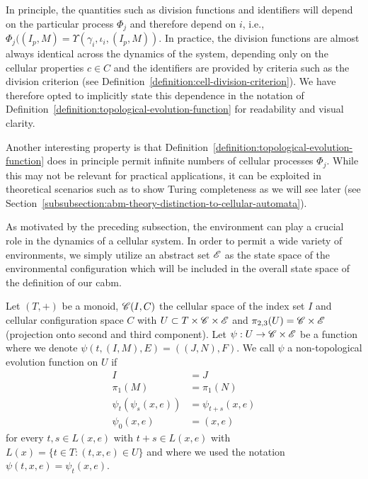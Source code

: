 In principle, the quantities such as division functions and identifiers will depend on the
particular process $\Phi_j$ and therefore depend on $i$, i.e.,
$\Phi_j((I_p,M)=\Upsilon(\gamma_i,\iota_i,(I_p,M))$.
In practice, the division functions are almost always identical across the dynamics of the system,
depending only on the cellular properties $c\in C$ and the identifiers are provided by criteria such
as the division criterion (see Definition~\ref{definition:cell-division-criterion}).
We have therefore opted to implicitly state this dependence in the notation of
Definition~\ref{definition:topological-evolution-function} for readability and visual clarity.

Another interesting property is that Definition~\ref{definition:topological-evolution-function}
does in principle permit infinite numbers of cellular processes $\Phi_j$.
While this may not be relevant for practical applications, it can be exploited in theoretical
scenarios such as to show Turing completeness as we will see later (see
Section~\ref{subsubsection:abm-theory-distinction-to-cellular-automata}).

As motivated by the preceding subsection, the environment can play a crucial role in the dynamics of
a cellular system.
In order to permit a wide variety of environments, we simply utilize an abstract set $\mathscr{E}$ as the
state space of the environmental configuration which will be included in the overall state space of
the definition of our \ac{cabm}.

\begin{definition}
    Let $(T,+)$ be a monoid, $\mathscr{C}(I,C)$ the cellular space of the index set $I$
    and cellular configuration space $C$ with $U\subset T\times\mathscr{C}\times\mathscr{E}$ and
    $\pi_{2,3}(U)=\mathscr{C}\times\mathscr{E}$ (projection onto second and third component).
    Let $\psi:U\rightarrow \mathscr{C}\times\mathscr{E}$ be a function where we denote $\psi(t,(I,M),E)=((J,N),F)$.
    We call $\psi$ a non-topological evolution function on $U$ if
    \begin{align}
        I&=J\\
        \pi_1(M)&=\pi_1(N)\\
        \psi_t(\psi_s(x,e)) &= \psi_{t+s}(x,e)
        \label{equation:non-topological-evolution-function-concatenation-1}\\
        \psi_0(x,e)&=(x,e)
        \label{equation:non-topological-evolution-function-concatenation-2}
    \end{align}
    for every $t,s\in L(x,e)$ with $t+s\in L(x,e)$ with $L(x)=\{t\in T:(t,x,e)\in U\}$ and where we
    used the notation $\psi(t,x,e)=\psi_t(x,e)$.
    \label{definition:non-topological-evolution-function}
\end{definition}

